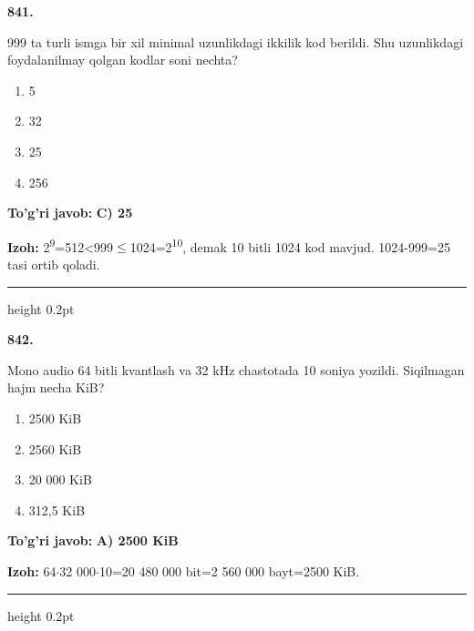 \documentclass[10pt,a4paper,oneside]{article}
\begin{document}
\noindent\textbf{\color{ink}841.}
\par
999 ta turli ismga bir xil minimal uzunlikdagi ikkilik kod berildi. Shu uzunlikdagi foydalanilmay qolgan kodlar soni nechta?
\begin{enumerate}[label=\Alph*),leftmargin=9mm]
\item 5
\item 32
\item 25
\item 256
\end{enumerate}
\begin{tcolorbox}[enhanced,breakable,colback=teal!4,colframe=teal!50!black,boxrule=0.5pt,arc=1.1mm,left=3mm,right=3mm,top=1.7mm,bottom=1.7mm,before skip=2mm,after skip=2mm]
\textbf{\color{teal}To'g'ri javob:} \textbf{C) 25}
\par\smallskip
\textbf{Izoh:} 2\textsuperscript{9}=512\textless{}999\ensuremath{\leq}1024=2\textsuperscript{1}\textsuperscript{0}, demak 10 bitli 1024 kod mavjud. 1024-999=25 tasi ortib qoladi.
\end{tcolorbox}
\vspace{2mm}\hrule height 0.2pt \vspace{3mm}

\noindent\textbf{\color{ink}842.}
\par
Mono audio 64 bitli kvantlash va 32 kHz chastotada 10 soniya yozildi. Siqilmagan hajm necha KiB?
\begin{enumerate}[label=\Alph*),leftmargin=9mm]
\item 2500 KiB
\item 2560 KiB
\item 20 000 KiB
\item 312,5 KiB
\end{enumerate}
\begin{tcolorbox}[enhanced,breakable,colback=teal!4,colframe=teal!50!black,boxrule=0.5pt,arc=1.1mm,left=3mm,right=3mm,top=1.7mm,bottom=1.7mm,before skip=2mm,after skip=2mm]
\textbf{\color{teal}To'g'ri javob:} \textbf{A) 2500 KiB}
\par\smallskip
\textbf{Izoh:} 64\ensuremath{\cdot}32 000\ensuremath{\cdot}10=20 480 000 bit=2 560 000 bayt=2500 KiB.
\end{tcolorbox}
\vspace{2mm}\hrule height 0.2pt \vspace{3mm}
\end{document}
